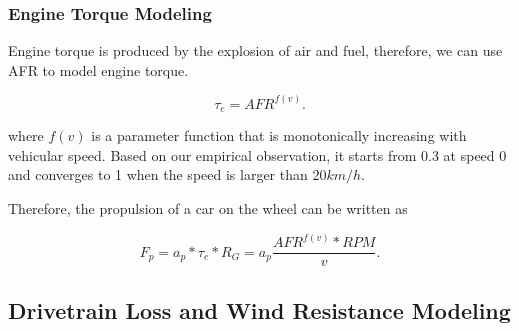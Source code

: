 \subsubsection{Engine Torque Modeling}



Engine torque is produced by the explosion of air and fuel, 
therefore, we can use AFR to model engine torque. 

\begin{equation}
\tau_e = AFR^{f(v)}.
\end{equation}


where $f(v)$ is a parameter function that is monotonically increasing
with vehicular speed. Based on our empirical observation, 
it starts from 0.3 at speed 0 and converges to 1 when the speed
is larger than $20km/h$. 

Therefore, the propulsion of a car on the wheel can be written as 

\begin{equation}
 F_p = a_p * \tau_e * R_G = a_p \frac{AFR^{f(v)} * RPM}{v}.
\end{equation}



\subsection{Drivetrain Loss and Wind Resistance Modeling}

